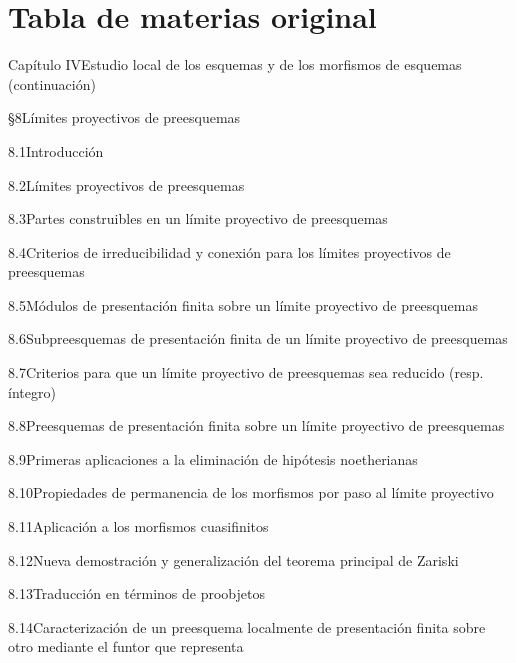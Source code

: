 \endgroup

\clearpage
{}
{}
\section*{Tabla de materias original}

\begingroup
\small
\newcommand{\EGAIVthreeContents}[3]{#1\quad #2\dotfill #3\par}

\EGAIVthreeContents{Capítulo IV}{Estudio local de los esquemas y de los morfismos de esquemas (continuación)}{5}
\EGAIVthreeContents{§8}{Límites proyectivos de preesquemas}{5}
\EGAIVthreeContents{8.1}{Introducción}{5}
\EGAIVthreeContents{8.2}{Límites proyectivos de preesquemas}{7}
\EGAIVthreeContents{8.3}{Partes construibles en un límite proyectivo de preesquemas}{12}
\EGAIVthreeContents{8.4}{Criterios de irreducibilidad y conexión para los límites proyectivos de preesquemas}{17}
\EGAIVthreeContents{8.5}{Módulos de presentación finita sobre un límite proyectivo de preesquemas}{19}
\EGAIVthreeContents{8.6}{Subpreesquemas de presentación finita de un límite proyectivo de preesquemas}{25}
\EGAIVthreeContents{8.7}{Criterios para que un límite proyectivo de preesquemas sea reducido (resp. íntegro)}{27}
\EGAIVthreeContents{8.8}{Preesquemas de presentación finita sobre un límite proyectivo de preesquemas}{28}
\EGAIVthreeContents{8.9}{Primeras aplicaciones a la eliminación de hipótesis noetherianas}{34}
\EGAIVthreeContents{8.10}{Propiedades de permanencia de los morfismos por paso al límite proyectivo}{36}
\EGAIVthreeContents{8.11}{Aplicación a los morfismos cuasifinitos}{41}
\EGAIVthreeContents{8.12}{Nueva demostración y generalización del teorema principal de Zariski}{43}
\EGAIVthreeContents{8.13}{Traducción en términos de proobjetos}{49}
\EGAIVthreeContents{8.14}{Caracterización de un preesquema localmente de presentación finita sobre otro mediante el funtor que representa}{52}

